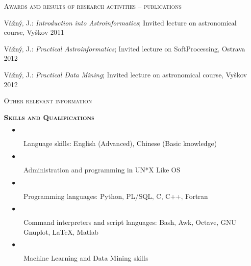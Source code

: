 \begin{cv}
\begin{cvlist}{\large \textsc{Awards and results of research activities -- publications}}
\item {Vážný}, J.: \textit{Introduction into Astroinformatics};
  Invited lecture on astronomical course, Vyškov 2011

\item {Vážný}, J.: \textit{Practical Astroinformatics};
  Invited lecture on SoftProcessing, Ostrava 2012

\item {Vážný}, J.: \textit{Practical Data Mining};
  Invited lecture on astronomical course, Vyškov 2012



\end{cvlist}







\noindent\hrulefill
\begin{cvlist}{\large \textsc{Other relevant information}}



\item{\bf{\textsc{Skills and Qualifications}}}
\begin{description}
 \item[\hspace{-2mm} $\quad \bullet$ \hspace{-1.5mm}] Language skills: English (Advanced), Chinese (Basic knowledge)\\[-6mm]
 \item[\hspace{-2mm} $\quad \bullet$ \hspace{-1.5mm}] Administration
   and programming in UN*X Like OS\\[-6mm]
   \item[\hspace{-2mm} $\quad \bullet$ \hspace{-1.5mm}] Programming
     languages: Python, PL/SQL, C, C++, Fortran\\[-6mm]
  \item[\hspace{-2mm} $\quad \bullet$ \hspace{-1.5mm}] Command
    interpreters and script languages: Bash, Awk, Octave, GNU Gnuplot,
    LaTeX, Matlab\\[-6mm]
\item[\hspace{-2mm} $\quad \bullet$ \hspace{-1.5mm}] Machine Learning
  and Data Mining skills\\[-6mm]
\end{description}





\end{cvlist}
\end{cv}
